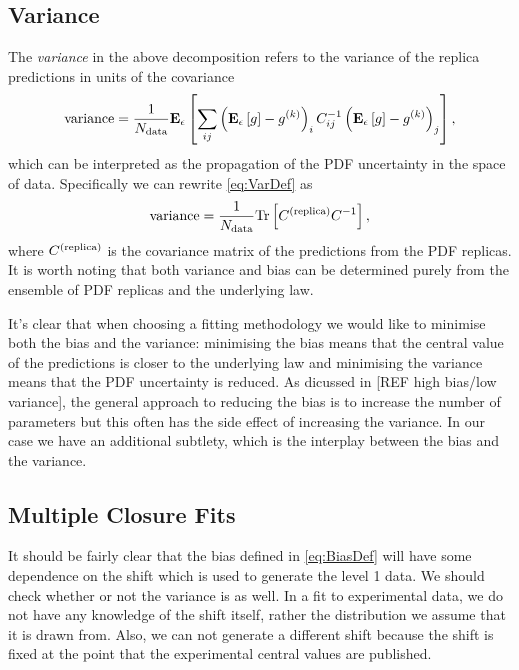 \subsection{Variance}

The {\em variance} in the above decomposition refers to the variance of the
replica predictions in units of the covariance
\begin{equation}
    \label{eq:VarDef}
    {\rm variance} = \frac{1}{N_{\rm data}} \mathbf{E}_{\epsilon}\left[  \sum_{ij} \left( \mathbf{E}_{\epsilon}\left[ g \right] - g^{(k)}\right)_{i} C^{-1}_{ij} \left( \mathbf{E}_{\epsilon}\left[ g \right] - g^{(k)}\right)_{j} \right],
\end{equation}
which can be interpreted as the propagation of the PDF uncertainty in the space
of data. Specifically we can rewrite \eqref{eq:VarDef} as
\begin{equation}
    \label{eq:VarDefalternative}
    {\rm variance} = \frac{1}{N_{\rm data}} {\rm Tr} \left[ C^{(\rm replica)} C^{-1}_{} \right],
\end{equation}
where $C^{(\rm replica)}$ is the covariance matrix of the predictions
from the PDF replicas.
It is worth noting that both variance and bias can be determined
purely from the ensemble of PDF replicas and the underlying law.

It's clear that when choosing a fitting methodology we would like to minimise
both the bias and the variance: minimising the bias means that the central
value of the predictions is closer to the underlying law and minimising
the variance means that the PDF uncertainty is reduced. As dicussed in [REF
high bias/low variance], the general approach to reducing the bias is to
increase the number of parameters but this often has the side effect of
increasing the variance. In our case we have an additional subtlety, which is
the interplay between the bias and the variance.

\subsection{Multiple Closure Fits}

It should be fairly clear that the bias defined in \eqref{eq:BiasDef} will have
some dependence on the shift which is used to generate the level 1 data. We should
check whether or not the variance is as well. In a fit to experimental
data, we do not have any knowledge of the shift itself, rather the distribution
we assume that it is drawn from. Also, we can not generate a different shift
because the shift is fixed at the point that the experimental central values
are published.

